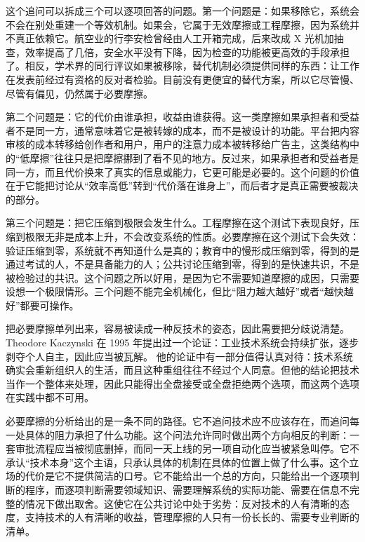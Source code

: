这个追问可以拆成三个可以逐项回答的问题。第一个问题是：如果移除它，系统会不会在别处重建一个等效机制。如果会，它属于无效摩擦或工程摩擦，因为系统并不真正依赖它。航空业的行李安检曾经由人工开箱完成，后来改成 X 光机加抽查，效率提高了几倍，安全水平没有下降，因为检查的功能被更高效的手段承担了。相反，学术界的同行评议如果被移除，替代机制必须提供同样的东西：让工作在发表前经过有资格的反对者检验。目前没有更便宜的替代方案，所以它尽管慢、尽管有偏见，仍然属于必要摩擦。

第二个问题是：它的代价由谁承担，收益由谁获得。这一类摩擦如果承担者和受益者不是同一方，通常意味着它是被转嫁的成本，而不是被设计的功能。平台把内容审核的成本转移给创作者和用户，用户的注意力成本被转移给广告主，这类结构中的“低摩擦”往往只是把摩擦挪到了看不见的地方。反过来，如果承担者和受益者是同一方，而且代价换来了真实的信息或能力，它更可能是必要的。这个问题的价值在于它能把讨论从“效率高低”转到“代价落在谁身上”，而后者才是真正需要被裁决的部分。

第三个问题是：把它压缩到极限会发生什么。工程摩擦在这个测试下表现良好，压缩到极限无非是成本上升，不会改变系统的性质。必要摩擦在这个测试下会失效：验证压缩到零，系统就不再知道什么是真的；教育中的慢形成压缩到零，得到的是通过考试的人，不是具备能力的人；公共讨论压缩到零，得到的是快速共识，不是被检验过的共识。这个问题之所以好用，是因为它不需要知道摩擦的成因，只需要设想一个极限情形。三个问题不能完全机械化，但比“阻力越大越好”或者“越快越好”都要可操作。


把必要摩擦单列出来，容易被读成一种反技术的姿态，因此需要把分歧说清楚。Theodore Kaczynski 在 1995 年提出过一个论证：工业技术系统会持续扩张，逐步剥夺个人自主，因此应当被瓦解。\cite{kaczynski1995industrial} 他的论证中有一部分值得认真对待：技术系统确实会重新组织人的生活，而且这种重组往往不经过个人同意。但他的结论把技术当作一个整体来处理，因此只能得出全盘接受或全盘拒绝两个选项，而这两个选项在实践中都不可用。

必要摩擦的分析给出的是一条不同的路径。它不追问技术应不应该存在，而追问每一处具体的阻力承担了什么功能。这个问法允许同时做出两个方向相反的判断：一套审批流程应当被彻底删掉，而同一天上线的另一项自动化应当被紧急叫停。它不承认“技术本身”这个主语，只承认具体的机制在具体的位置上做了什么事。这个立场的代价是它不提供简洁的口号。它不能给出一个总的方向，只能给出一个逐项判断的程序，而逐项判断需要领域知识、需要理解系统的实际功能、需要在信息不完整的情况下做出取舍。这使它在公共讨论中处于劣势：反对技术的人有清晰的态度，支持技术的人有清晰的收益，管理摩擦的人只有一份长长的、需要专业判断的清单。

